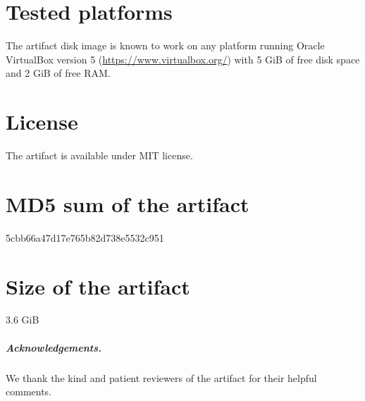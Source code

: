 \documentclass[a4paper,UKenglish]{darts-v2018}
\newenvironment{platforms}{\section{Tested platforms}}{}
\newcommand{\license}[1]{{\section{License}#1}}
\newcommand{\mdsum}[1]{{\section{MD5 sum of the artifact}#1}}
\newcommand{\artifactsize}[1]{{\section{Size of the artifact}#1}}
\begin{document}
\begin{platforms}
  The artifact disk image is known to work on any platform running
  Oracle VirtualBox version 5 (\url{https://www.virtualbox.org/}) with
  5 GiB of free disk space and 2 GiB of free RAM.
\end{platforms}

\license{The artifact is available under MIT license.}

\mdsum{5cbb66a47d17e765b82d738e5532c951}

\artifactsize{3.6 GiB}

\subparagraph*{Acknowledgements.}

We thank the kind and patient reviewers of the artifact for their helpful comments. 
\end{document}
